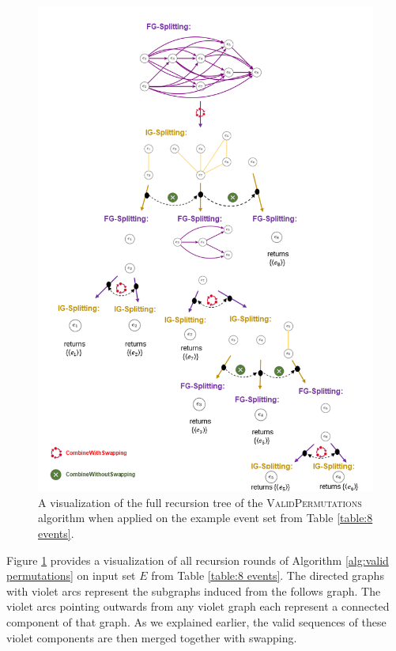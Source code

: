 \begin{figure}
	\centering
	\includegraphics[width=1 \columnwidth]{figures/alg_visualization_paper.png}
	\caption{A visualization of the full recursion tree of the \textsc{ValidPermutations} algorithm when applied on the example event set from Table \ref{table:8 events}.}
	\label{fig: algorithm visualization}
\end{figure}
%
%
%
%
%
%
% 
Figure \ref{fig: algorithm visualization} provides a visualization of all recursion rounds of Algorithm \ref{alg:valid permutations} on input set $E$ from Table \ref{table:8 events}.
The directed graphs with violet arcs represent the subgraphs induced from the follows graph.
The violet arcs pointing outwards from any violet graph each represent a connected component of that graph.
As we explained earlier, the valid sequences of these violet components are then merged together with swapping.
